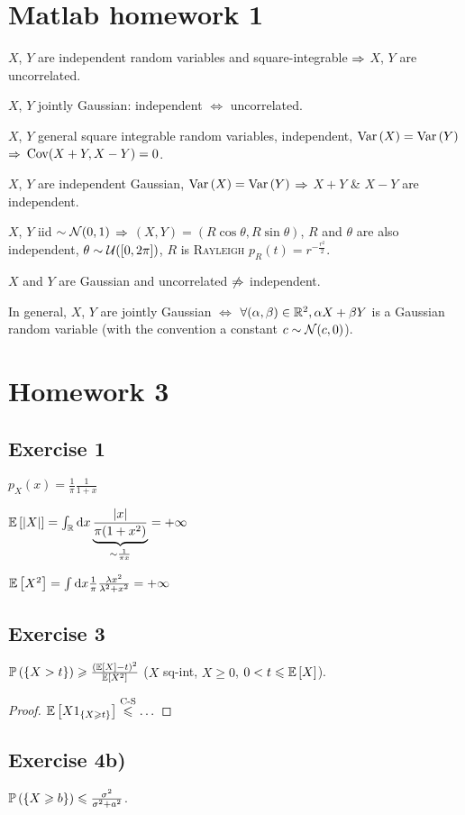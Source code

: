 \section{Matlab homework 1}

$X$, $Y$ are independent random variables and square-integrable $\Rightarrow$ $X$, $Y$ are uncorrelated.

$X$, $Y$ jointly Gaussian: independent $\iff$ uncorrelated.

$X$, $Y$ general square integrable random variables, independent, $\text{Var}\left( X \right) = \text{Var}\left( Y \right)$ $\Rightarrow$ $\operatorname{Cov}(X+Y,X-Y) = 0$.

$X$, $Y$ are independent Gaussian, $\text{Var}\left( X \right) = \text{Var}\left( Y \right)$ $\Rightarrow$ $X+Y$ \& $X-Y$ are independent.

$X$, $Y$ iid $\sim \mathcal{N}(0,1)$ $\Rightarrow$ $(X,Y) = (R\cos \theta, R\sin \theta)$, $R$ and $\theta$ are also independent, $\theta \sim \mathcal{U}([0,2\pi])$, $R$ is \textsc{Rayleigh} $p_R(t) = r^{-\frac{r^2}{2}}$.

$X$ and $Y$ are Gaussian and uncorrelated $\not\Rightarrow$ independent.

\begin{proposition}[Or not...]
    In general, $X$, $Y$ are jointly Gaussian $\iff$ $\forall (\alpha,\beta) \in \mathbb{R}^2, \alpha X + \beta Y$ is a Gaussian random variable (with the convention a constant $c\sim \mathcal{N}(c,0)$).
\end{proposition}

\section{Homework 3}
    \subsection{Exercise 1}

$p_X(x) = \frac{1}{\pi} \frac{1}{1+x}$

$\mathbb{E}\left[ \lvert X \rvert \right] = \int_{\mathbb{R}}\mathrm{d} x \underbrace{\frac{\lvert x \rvert}{\pi(1+x^2)}}_{\sim\frac{1}{\pi x}} = +\infty$

$\mathbb{E}\left[ X^2 \right] = \int \mathrm{d} x \frac{1}{\pi}\frac{\lambda x^2}{\lambda^2+x^2} = +\infty$

    \subsection{Exercise 3}
    
$\mathbb{P}\left( \left\{ X > t \right\} \right) \geqslant \frac{(\mathbb{E}\left[ X \right]-t)^2}{\mathbb{E}\left[ X^2 \right]}$ ($X$ sq-int, $X \geqslant 0$, $0 < t \leqslant \mathbb{E}\left[ X \right]$).

\begin{proof}
    $\mathbb{E}\left[ X1_{\left\{ X\geqslant t \right\}} \right] \overset{\text{C-S}}{\leqslant} \ldots$
\end{proof}

    \subsection{Exercise 4b)}
    
$\mathbb{P}\left( \left\{ X\geqslant b \right\} \right) \leqslant \frac{\sigma^2}{\sigma^2+a^2}$.

